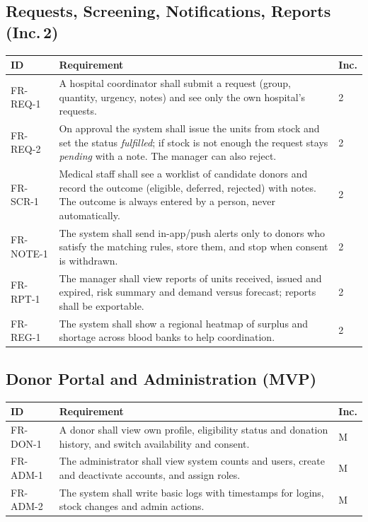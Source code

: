 \documentclass{scrreprt}
\begin{document}
\subsection*{Requests, Screening, Notifications, Reports (Inc.\,2)}
\begin{longtable}{@{}l L{11.6cm} l@{}}
\toprule
\textbf{ID} & \textbf{Requirement} & \textbf{Inc.}\\
\midrule
\endhead
FR-REQ-1 & A hospital coordinator shall submit a request (group, quantity, urgency, notes) and see only the own hospital's requests. & 2\\
FR-REQ-2 & On approval the system shall issue the units from stock and set the status \emph{fulfilled}; if stock is not enough the request stays \emph{pending} with a note. The manager can also reject. & 2\\
FR-SCR-1 & Medical staff shall see a worklist of candidate donors and record the outcome (eligible, deferred, rejected) with notes. The outcome is always entered by a person, never automatically. & 2\\
FR-NOTE-1 & The system shall send in-app/push alerts only to donors who satisfy the matching rules, store them, and stop when consent is withdrawn. & 2\\
FR-RPT-1 & The manager shall view reports of units received, issued and expired, risk summary and demand versus forecast; reports shall be exportable. & 2\\
FR-REG-1 & The system shall show a regional heatmap of surplus and shortage across blood banks to help coordination. & 2\\
\bottomrule
\end{longtable}

\subsection*{Donor Portal and Administration (MVP)}
\begin{longtable}{@{}l L{11.6cm} l@{}}
\toprule
\textbf{ID} & \textbf{Requirement} & \textbf{Inc.}\\
\midrule
\endhead
FR-DON-1 & A donor shall view own profile, eligibility status and donation history, and switch availability and consent. & M\\
FR-ADM-1 & The administrator shall view system counts and users, create and deactivate accounts, and assign roles. & M\\
FR-ADM-2 & The system shall write basic logs with timestamps for logins, stock changes and admin actions. & M\\
\bottomrule
\end{longtable}
\end{document}

